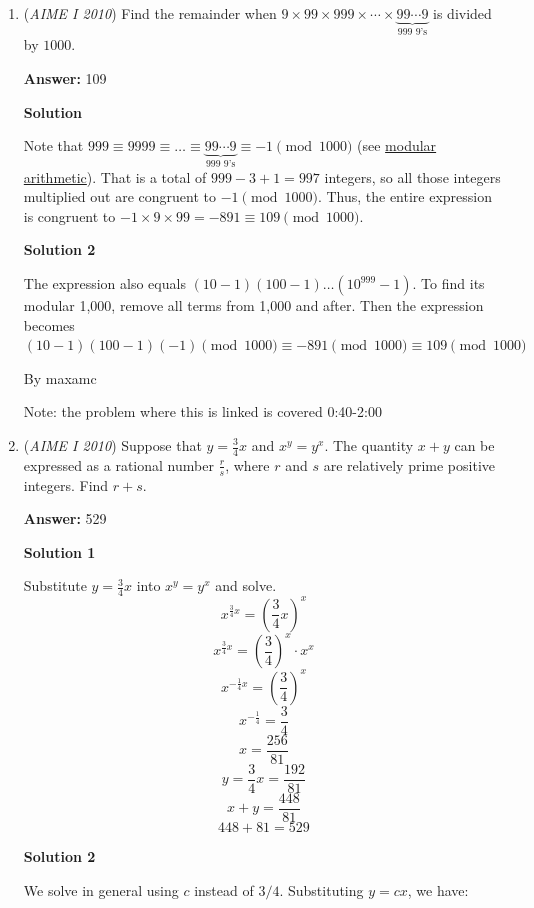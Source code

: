 \begin{enumerate}
 


	\item (\textit{AIME I 2010}) Find the remainder when $9 \times 99 \times 999 \times \cdots \times \underbrace{99\cdots9}_{\text{999 9's}}$ is divided by $1000$.


 
 \textbf{Answer: }109



\textbf{Solution}

Note that $999\equiv 9999\equiv\dots \equiv\underbrace{99\cdots9}_{\text{999 9's}}\equiv -1 \pmod{1000}$ (see \href{https://artofproblemsolving.com/wiki/index.php?title=Modular\_arithmetic}{modular arithmetic}). That is a total of $999 - 3 + 1 = 997$ integers, so all those integers multiplied out are congruent to $- 1\pmod{1000}$. Thus, the entire expression is congruent to $- 1\times9\times99 = - 891\equiv\boxed{109}\pmod{1000}$.

 



\textbf{Solution 2}

The expression also equals $(10-1)(100-1)\dots({10^{999}}-1)$. To find its modular 1,000, remove all terms from 1,000 and after. Then the expression becomes $(10-1)(100-1)(-1) \pmod{1000} \equiv -891 \pmod{1000} \equiv \boxed{109}\pmod{1000}$

 By maxamc

 Note: the problem where this is linked is covered 0:40-2:00

 


	\item (\textit{AIME I 2010}) Suppose that $y = \frac34x$ and $x^y = y^x$. The quantity $x + y$ can be expressed as a rational number $\frac {r}{s}$, where $r$ and $s$ are relatively prime positive integers. Find $r + s$.


 
 \textbf{Answer: }529



\textbf{Solution 1}

Substitute $y = \frac34x$ into $x^y = y^x$ and solve.
 \[x^{\frac34x} = \left(\frac34x\right)^x\]
 \[x^{\frac34x} = \left(\frac34\right)^x \cdot x^x\]
 \[x^{-\frac14x} = \left(\frac34\right)^x\]
 \[x^{-\frac14} = \frac34\]
 \[x = \frac{256}{81}\]
 \[y = \frac34x = \frac{192}{81}\]
 \[x + y = \frac{448}{81}\]
 \[448 + 81 = \boxed{529}\]




\textbf{Solution 2}

We solve in general using $c$ instead of $3/4$. Substituting $y = cx$, we have:


\end{enumerate}
